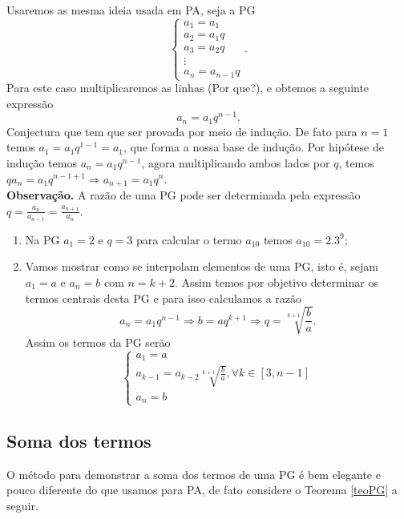 \inic Usaremos as mesma ideia usada em PA, seja a PG
\begin{equation}
    \begin{cases}
    a_1 = a_1\\
    a_2 = a_1q\\
    a_3 = a_2q\\
    \vdots\\
    a_n = a_{n-1}q
    \end{cases}.
\end{equation}
\inic Para este caso multiplicaremos as linhas (Por que?), e obtemos a seguinte expressão 
$$a_n = a_1q^{n-1}.$$
\inic Conjectura que tem que ser provada por meio de indução. De fato para $n=1$ temos $a_1 = a_1q^{1-1} = a_1$, que forma a nossa base de indução. Por hipótese de indução temos $a_n=a_1q^{n-1}$, agora multiplicando ambos lados por $q$, temos $qa_n=a_1q^{n-1+1} \Rightarrow a_{n+1} = a_1q^{n}$.\\

\noindent \textbf{Observação.} A razão de uma PG pode ser determinada pela expressão $\displaystyle q = \frac{a_n}{a_{n-1}} = \frac{a_{n+1}}{a_n}$.

\begin{example}
\begin{enumerate}
    \item [(i)] Na PG $a_1 = 2$ e $q=3$ para calcular o termo $a_{10}$ temos $a_{10} = 2.3^{9}$;
    \item[(ii)] Vamos mostrar como se interpolam elementos de uma PG, isto é, sejam $a_1=a$ e $a_n=b$ com $n=k+2$. Assim temos por objetivo determinar os termos centrais desta PG e para isso calculamos a razão
    $$a_n=a_1q^{n-1}\Rightarrow b = aq^{k+1} \Rightarrow q = \sqrt[k+1]{\frac{b}{a}}.$$ 
    Assim os termos da PG serão 
    \begin{equation}
        \begin{cases}
        a_1 = a\\
        \displaystyle a_{k-1}=a_{k-2}\sqrt[k+1]{\frac{b}{a}} ,\forall k \in [3,n-1]\\
        a_n = b
        \end{cases}
    \end{equation}
\end{enumerate}
\subsection{Soma dos termos}
\inic O método para demonstrar a soma dos termos de uma PG é bem elegante e pouco diferente do que usamos para PA, de fato considere o Teorema \ref{teoPG} a seguir.
\end{example}

